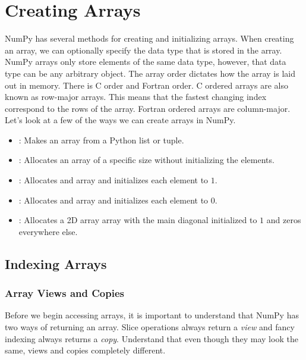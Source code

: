 \section*{Creating Arrays}
NumPy has several methods for creating and initializing arrays.  When creating an array, we can optionally specify the data type that is stored in the array.  NumPy arrays only store elements of the same data type, however, that data type can be any arbitrary object.  The array order dictates how the array is laid out in memory.  There is C order and Fortran order.  C ordered arrays are also known as row-major arrays.  This means that the fastest changing index correspond to the rows of the array.  Fortran ordered arrays are column-major.  Let's look at a few of the ways we can create arrays in NumPy.
\begin{itemize}
\item {}: Makes an array from a Python list or tuple.
\item {}: Allocates an array of a specific size without initializing the elements.
\item {}: Allocates and array and initializes each element to $1$.
\item {}: Allocates and array and initializes each element to $0$.
\item {}: Allocates a 2D array array with the main diagonal initialized to $1$ and zeros everywhere else.
\end{itemize}

\subsection*{Indexing Arrays}
\subsubsection*{Array Views and Copies}
Before we begin accessing arrays, it is important to understand that NumPy has two ways of returning an array.  Slice operations always return a \emph{view} and fancy indexing always returns a \emph{copy}.  Understand that even though they may look the same, views and copies completely different.

